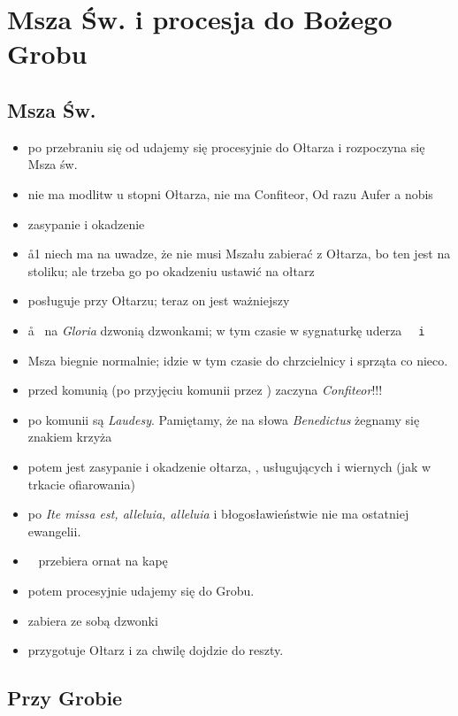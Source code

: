 \section{Msza Św. i procesja do Bożego Grobu}

	\subsection{Msza Św.}

	\begin{itemize}
		\item po przebraniu się od udajemy się procesyjnie do Ołtarza i rozpoczyna się Msza św. 
		\item nie ma modlitw u stopni Ołtarza, nie ma Confiteor, Od razu Aufer a nobis 
		\item zasypanie i okadzenie
		\item \aa1 niech ma	na uwadze, że nie musi Mszału zabierać z Ołtarza, bo ten jest na stoliku; ale trzeba go po okadzeniu ustawić na ołtarz
		\item {} posługuje przy Ołtarzu; teraz on jest ważniejszy
		\item \aa~ na \textit{Gloria} dzwonią dzwonkami; w tym czasie w sygnaturkę uderza \tt~ i 
		\item Msza biegnie normalnie;  idzie w tym czasie do chrzcielnicy i sprząta co nieco.
		\item przed komunią (po przyjęciu komunii przez \ii)  zaczyna \textit{Confiteor}!!!
		\item po komunii są \textit{Laudesy}. Pamiętamy, że na słowa \textit{Benedictus} żegnamy się znakiem krzyża
		\item potem	jest zasypanie i okadzenie ołtarza, \ii, usługujących i wiernych (jak w trkacie ofiarowania)
		\item po \textit{Ite missa est, alleluia, alleluia} i błogosławieństwie nie ma ostatniej ewangelii. 
		\item \ii~ przebiera ornat na kapę
		\item potem procesyjnie udajemy się do Grobu. 
		\item {} zabiera ze sobą dzwonki
		\item {} przygotuje Ołtarz i za chwilę dojdzie do reszty.
	\end{itemize}

	\subsection{Przy Grobie}
	
